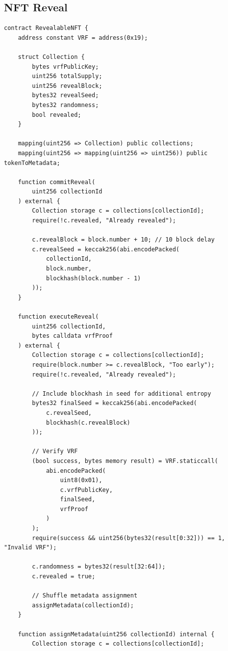 \documentclass[11pt,a4paper]{article}
\theoremstyle{definition}
\begin{document}
\subsection{NFT Reveal}

\begin{lstlisting}[language=Solidity]
contract RevealableNFT {
    address constant VRF = address(0x19);

    struct Collection {
        bytes vrfPublicKey;
        uint256 totalSupply;
        uint256 revealBlock;
        bytes32 revealSeed;
        bytes32 randomness;
        bool revealed;
    }

    mapping(uint256 => Collection) public collections;
    mapping(uint256 => mapping(uint256 => uint256)) public tokenToMetadata;

    function commitReveal(
        uint256 collectionId
    ) external {
        Collection storage c = collections[collectionId];
        require(!c.revealed, "Already revealed");

        c.revealBlock = block.number + 10; // 10 block delay
        c.revealSeed = keccak256(abi.encodePacked(
            collectionId,
            block.number,
            blockhash(block.number - 1)
        ));
    }

    function executeReveal(
        uint256 collectionId,
        bytes calldata vrfProof
    ) external {
        Collection storage c = collections[collectionId];
        require(block.number >= c.revealBlock, "Too early");
        require(!c.revealed, "Already revealed");

        // Include blockhash in seed for additional entropy
        bytes32 finalSeed = keccak256(abi.encodePacked(
            c.revealSeed,
            blockhash(c.revealBlock)
        ));

        // Verify VRF
        (bool success, bytes memory result) = VRF.staticcall(
            abi.encodePacked(
                uint8(0x01),
                c.vrfPublicKey,
                finalSeed,
                vrfProof
            )
        );
        require(success && uint256(bytes32(result[0:32])) == 1, "Invalid VRF");

        c.randomness = bytes32(result[32:64]);
        c.revealed = true;

        // Shuffle metadata assignment
        assignMetadata(collectionId);
    }

    function assignMetadata(uint256 collectionId) internal {
        Collection storage c = collections[collectionId];


\end{lstlisting}
\end{document}
